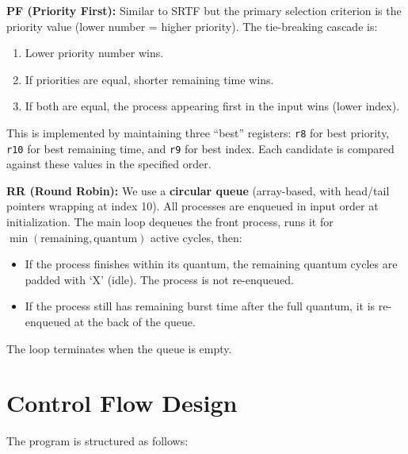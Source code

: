 \documentclass[a4paper,12pt]{article}
\begin{document}
\textbf{PF (Priority First):}
Similar to SRTF but the primary selection criterion is the priority value (lower number = higher priority). The tie-breaking cascade is:
\begin{enumerate}
    \item Lower priority number wins.
    \item If priorities are equal, shorter remaining time wins.
    \item If both are equal, the process appearing first in the input wins (lower index).
\end{enumerate}
This is implemented by maintaining three ``best'' registers: \texttt{r8} for best priority, \texttt{r10} for best remaining time, and \texttt{r9} for best index. Each candidate is compared against these values in the specified order.

\textbf{RR (Round Robin):}
We use a \textbf{circular queue} (array-based, with head/tail pointers wrapping at index 10). All processes are enqueued in input order at initialization. The main loop dequeues the front process, runs it for $\min(\text{remaining}, \text{quantum})$ active cycles, then:
\begin{itemize}
    \item If the process finishes within its quantum, the remaining quantum cycles are padded with `X' (idle). The process is not re-enqueued.
    \item If the process still has remaining burst time after the full quantum, it is re-enqueued at the back of the queue.
\end{itemize}
The loop terminates when the queue is empty.


\section{Control Flow Design}

The program is structured as follows:
\end{document}
